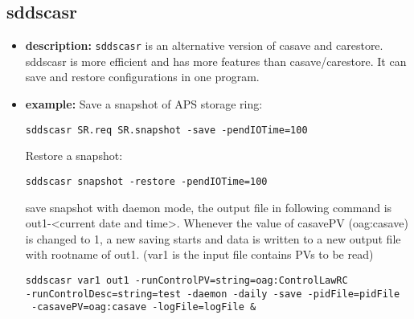%
%
\begin{latexonly}
\newpage
\end{latexonly}

%
%
\subsection{sddscasr}
\label{sddscasr}

\begin{itemize}
\item {\bf description:}
%
%
\verb+sddscasr+ is an alternative version of casave and carestore. sddscasr is
more efficient and has more features than casave/carestore. It can save
and restore configurations in one program.

\item {\bf example:} 
%
% 
%
Save a snapshot of APS storage ring:
\begin{verbatim}
sddscasr SR.req SR.snapshot -save -pendIOTime=100
\end{verbatim}
Restore a snapshot:
\begin{verbatim}
sddscasr snapshot -restore -pendIOTime=100
\end{verbatim}
save snapshot with daemon mode, the output file in following command is out1-<current date and time>.
Whenever the value of casavePV (oag:casave) is changed to 1, a new saving starts and data is written
to a new output file with rootname of out1. (var1 is the input file contains PVs to be read)
\begin{verbatim}
sddscasr var1 out1 -runControlPV=string=oag:ControlLawRC 
-runControlDesc=string=test -daemon -daily -save -pidFile=pidFile
 -casavePV=oag:casave -logFile=logFile &
\end{verbatim}


\end{itemize}
